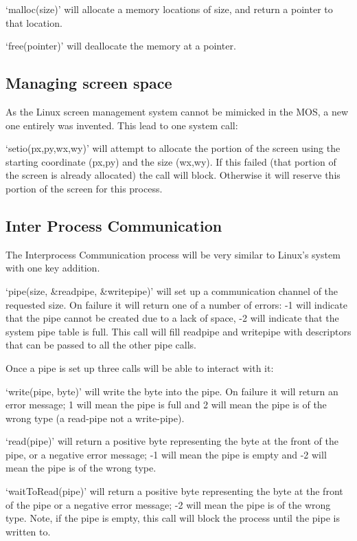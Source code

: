\documentclass[a4paper]{report}
\begin{document}
`malloc(size)' will allocate a memory locations of size, and return a pointer to that location.

`free(pointer)' will deallocate the memory at a pointer.

\subsection{Managing screen space}

As the Linux screen management system cannot be mimicked in the MOS, a new one entirely was invented. This lead to one system call:

`setio(px,py,wx,wy)' will attempt to allocate the portion of the screen using the starting coordinate (px,py) and the size (wx,wy). If this failed (that portion of the screen is already allocated) the call will block. Otherwise it will reserve this portion of the screen for this process.


\subsection{Inter Process Communication}

The Interprocess Communication process will be very similar to Linux's system with one key addition.

`pipe(size, \&readpipe, \&writepipe)' will set up a communication channel of the requested size. On failure it will return one of a number of errors: -1 will indicate that the pipe cannot be created due to a lack of space, -2 will indicate that the system pipe table is full. This call will fill readpipe and writepipe with descriptors that can be passed to all the other pipe calls.

Once a pipe is set up three calls will be able to interact with it:

`write(pipe, byte)' will write the byte into the pipe. On failure it will return an error message; 1 will mean the pipe is full and 2 will mean the pipe is of the wrong type (a read-pipe not a write-pipe).

`read(pipe)' will return a positive byte representing the byte at the front of the pipe, or a negative error message; -1 will mean the pipe is empty and -2 will mean the pipe is of the wrong type.

`waitToRead(pipe)' will return a positive byte representing the byte at the front of the pipe or a negative error message; -2 will mean the pipe is of the wrong type. Note, if the pipe is empty, this call will block the process until the pipe is written to.
\end{document}
